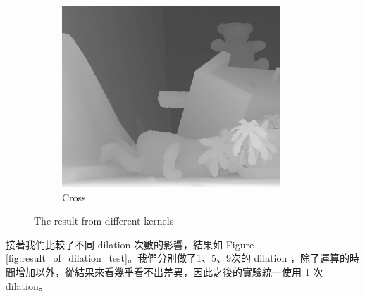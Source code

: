 \documentclass{article}
\begin{document}
\begin{CJK*}{UTF8}{bkai}
\begin{figure}[h]
\begin{subfigure}{.3\textwidth}
        \includegraphics[width=0.9\textwidth]{results/plus.png}
        \caption{Cross}
    \end{subfigure}
    \caption{The result from different kernels}
    \label{fig:result_of_kernels}
\end{figure}

接著我們比較了不同 dilation 次數的影響，結果如 Figure \ref{fig:result_of_dilation_test}。我們分別做了1、5、9次的 dilation ，除了運算的時間增加以外，從結果來看幾乎看不出差異，因此之後的實驗統一使用 1 次 dilation。


\end{CJK*}
\end{document}
